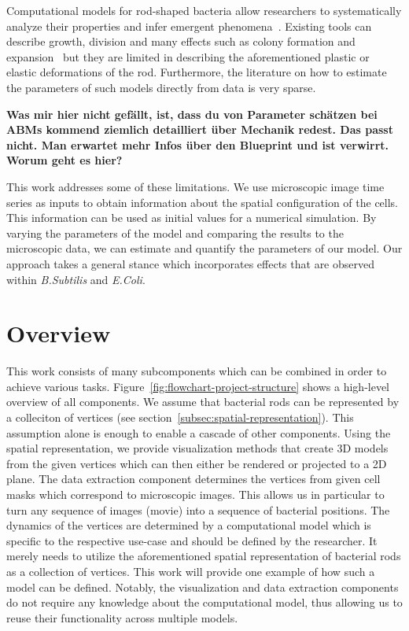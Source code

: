 \documentclass{article}
\begin{document}
Computational models for rod-shaped bacteria allow researchers to systematically analyze their
properties and infer emergent phenomena~\cite{Cho2007,Jnsson2005}.
Existing tools can describe growth, division and many effects such as colony formation and
expansion~\cite{Matyjaszkiewicz2017,Doumic2020} but they are limited in describing the
aforementioned plastic or elastic deformations of the rod. Furthermore, the literature on how to
estimate the parameters of such models directly from data is very sparse.

\textbf{
    Was mir hier nicht gefällt, ist, dass du von Parameter schätzen bei ABMs kommend ziemlich
    detailliert über Mechanik redest.
    Das passt nicht.
    Man erwartet mehr Infos über den Blueprint und ist verwirrt.
    Worum geht es hier?
}

This work addresses some of these limitations.
We use microscopic image time series as inputs to obtain information about the spatial configuration
of the cells.
This information can be used as initial values for a numerical simulation.
By varying the parameters of the model and comparing the results to the microscopic data, we can
estimate and quantify the parameters of our model.
Our approach takes a general stance which incorporates effects that are observed within
\textit{B.Subtilis} and \textit{E.Coli}.

\section{Overview}
This work consists of many subcomponents which can be combined in order to achieve various tasks.
Figure~\ref{fig:flowchart-project-structure} shows a high-level overview of all components.
We assume that bacterial rods can be represented by a colleciton of vertices (see
section~\ref{subsec:spatial-representation}).
This assumption alone is enough to enable a cascade of other components.
Using the spatial representation, we provide visualization methods that create 3D models from the
given vertices which can then either be rendered or projected to a 2D plane.
The data extraction component determines the vertices from given cell masks which
correspond to microscopic images.
This allows us in particular to turn any sequence of images (movie) into a sequence of bacterial
positions.
The dynamics of the vertices are determined by a computational model which is specific
to the respective use-case and should be defined by the researcher.
It merely needs to utilize the aforementioned spatial representation of bacterial rods as a
collection of vertices.
This work will provide one example of how such a model can be defined.
Notably, the visualization and data extraction components do not require any knowledge about the
computational model, thus allowing us to reuse their functionality across multiple models.
\end{document}

